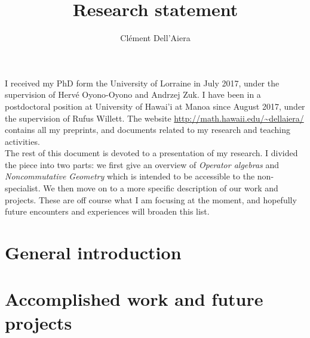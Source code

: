 \documentclass[a4paper]{article}
\title{Research statement}
\date{}
\author{ Cl\'ement Dell'Aiera}
\begin{document}
\maketitle

I received my PhD form the University of Lorraine in July 2017, under the supervision of Herv\'e Oyono-Oyono and Andrzej Zuk. I have been in a postdoctoral position at University of Hawai'i at Manoa since August 2017, under the supervision of Rufus Willett. The website \url{http://math.hawaii.edu/~dellaiera/} contains all my preprints, and documents related to my research and teaching activities.\\ 

The rest of this document is devoted to a presentation of my research. I divided the piece into two parts: we first give an overview of \textit{Operator algebras} and \textit{Noncommutative Geometry} which is intended to be accessible to the non-specialist. We then move on to a more specific description of our work and projects. These are off course what I am focusing at the moment, and hopefully future encounters and experiences will broaden this list.

\section{General introduction}


\section{Accomplished work and future projects}



 
\end{document}
